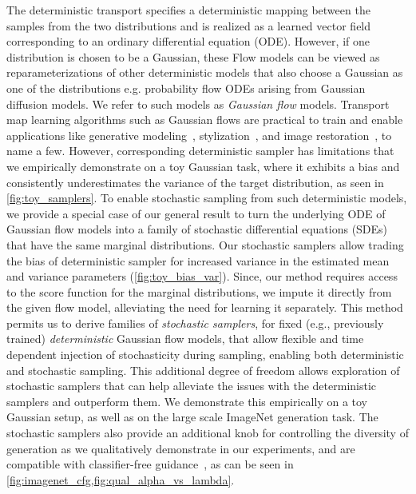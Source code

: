 The deterministic transport specifies a deterministic mapping between the samples from the two distributions and is realized as a learned vector field corresponding to an ordinary differential equation (ODE).
However, if one distribution is chosen to be a Gaussian, these Flow models can be viewed as reparameterizations of other deterministic models that also choose a Gaussian as one of the distributions e.g. probability flow ODEs arising from Gaussian diffusion models.
We refer to such models as \emph{Gaussian flow} models.
Transport map learning algorithms such as Gaussian flows are practical to train and enable applications like generative modeling~\citep{ramesh2022hierarchical,lu2022dpmsolver,saharia2022photorealistic,esser2024scaling}, stylization~\citep{isola2017image,meng2022sdedit}, and image restoration~\citep{delbracio2023inversion,rombach2022high,lugmayr2022repaint,kawar2022denoising}, to name a few.
However, corresponding deterministic sampler has limitations that we empirically demonstrate on a toy Gaussian task, where it exhibits a bias and consistently underestimates the variance of the target distribution, as seen in \cref{fig:toy_samplers}.
To enable stochastic sampling from such deterministic models, we provide a special case of our general result to turn the underlying ODE of Gaussian flow models into a family of stochastic differential equations (SDEs) that have the same marginal distributions.
Our stochastic samplers allow trading the bias of deterministic sampler for increased variance in the estimated mean and variance parameters (\cref{fig:toy_bias_var}).
Since, our method requires access to the score function for the marginal distributions, we impute it directly from the given flow model, alleviating the need for learning it separately.
This method permits us to derive families of \emph{stochastic samplers}, for fixed (e.g., previously trained) \emph{deterministic} Gaussian flow models, that allow flexible and time dependent injection of stochasticity during sampling, enabling both deterministic and stochastic sampling.
This additional degree of freedom allows exploration of stochastic samplers that can help alleviate the issues with the deterministic samplers and outperform them.
We demonstrate this empirically on a toy Gaussian setup, as well as on the large scale ImageNet generation task.
The stochastic samplers also provide an additional knob for controlling the diversity of generation as we qualitatively demonstrate in our experiments, and are compatible with classifier-free guidance~\citep{ho2022classifier}, as can be seen in \cref{fig:imagenet_cfg,fig:qual_alpha_vs_lambda}.

